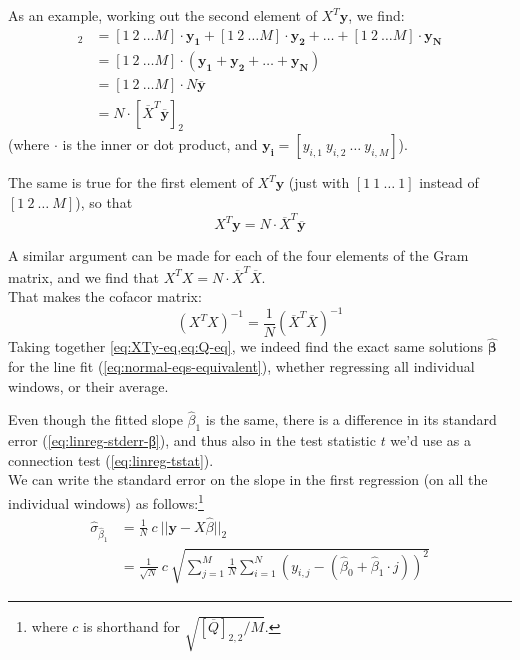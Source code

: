 As an example, working out the second element of $X^T \bm{y}$, we find:
\begin{align}
    [X^T \bm{y}]_2
    &= [1\ 2\ … M] · \bm{y_1} + [1\ 2\ … M] · \bm{y_2} + … + [1\ 2\ … M] · \bm{y_N}  \nonumber \\
    &= [1\ 2\ … M] · (\bm{y_1} + \bm{y_2} + … + \bm{y_N})   \nonumber \\
    &= [1\ 2\ … M] · N \overline{\bm{y}}   \nonumber \\
    &= N · [\overline{X}^T \overline{\bm{y}}]_2
\end{align}
(where $·$ is the inner or dot product, and $\bm{y_i} = [y_{i,1}\ y_{i,2}\ …\ y_{i,M}]$).

The same is true for the first element of $X^T \bm{y}$ (just with $[1\ 1\ …\ 1]$ instead of $[1\ 2\ …\ M]$), so that
\begin{equation} \label{eq:XTy-eq}
    X^T \bm{y} = N · \overline{X}^T \overline{\bm{y}}
\end{equation}

A similar argument can be made for each of the four elements of the Gram matrix, and we find that $X^T X = N · \overline{X}^T \overline{X}$.\\
That makes the cofacor matrix:
\begin{equation} \label{eq:Q-eq}
    (X^T X)^{-1} = \frac{1}{N} (\overline{X}^T \overline{X})^{-1}
\end{equation}
Taking together \cref{eq:XTy-eq,eq:Q-eq}, we indeed find the exact same solutions $\hat{\bm{β}}$ for the line fit (\cref{eq:normal-eqs-equivalent}), whether regressing all individual windows, or their average.

Even though the fitted slope $\hat{β}_1$ is the same, there is a difference in its standard error (\cref{eq:linreg-stderr-β}), and thus also in the test statistic $t$ we'd use as a connection test (\cref{eq:linreg-tstat}).\\
We can write the standard error on the slope in the first regression (on all the individual windows) as follows:\footnote{
    where $c$ is shorthand for $\sqrt{\left[\overline{Q}\right]_{2,2} / M}$.
}
\begin{align}
    \hat{σ}_{\hat{β}_1}
    &= \frac{1}{N}\ c\ || \bm{y} - X \hat{β} ||_2  \\
    &= \frac{1}{\sqrt{N}}\ c\ \sqrt{\sum_{j=1}^M \frac{1}{N}\sum_{i=1}^N
    \left( y_{i,j} - (\hat{β}_0 + \hat{β}_1 · j)  \right)^2 }  \label{eq:stderr-wins}
\end{align}

